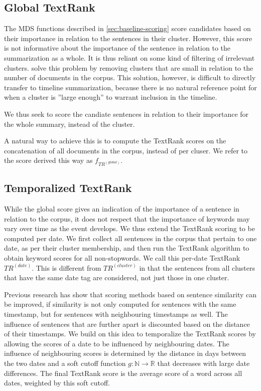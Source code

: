 \documentclass[a4paper,BCOR=10mm]{report}
\numberwithin{lemma}{chapter}
\numberwithin{definition}{chapter}
\begin{document}
\subsection{Global TextRank}

The MDS functions described in \ref{sec:baseline-scoring} score candidates based on their importance in relation to the sentences in their cluster.
However, this score is not informative about the importance of the sentence in relation to the summarization as a whole.
It is thus reliant on some kind of filtering of irrelevant clusters. \citet{banerjee} solve this problem by removing clusters that are small in relation to the number of documents in the corpus. This solution, however, is difficult to directly transfer to timeline summarization, because there is no natural reference point for when a cluster is ''large enough'' to warrant inclusion in the timeline.

We thus seek to score the candiate sentences in relation to their importance for the whole summary, instead of the cluster.

A natural way to achieve this is to compute the TextRank \citep{textrank} scores on the concatenation of all documents in the corpus, instead of per cluser.
We refer to the score derived this way as $f_{TR^{(global)}}$.

\subsection{Temporalized TextRank}

While the global score gives an indication of the importance of a sentence in relation to the corpus, it does not respect that the importance of keywords may vary over time as the event develops.
We thus extend the TextRank scoring to be computed per date. We first collect all sentences in the corpus that pertain to one date, as per their cluster membership, and then run the TextRank algorithm to obtain keyword scores for all non-stopwords. We call this per-date TextRank $TR^{(date)}$.
This is different from $TR^{(cluster)}$ in that the sentences from all clusters that have the same date tag are considered, not just those in one cluster.

Previous research \citep{yan-trans, markert} has show that scoring methods based on sentence similarity can be improved, if similarity is not only computed for sentences with the same timestamp, but for sentences with neighbouring timestamps as well. The influence of sentences that are further apart is discounted based on the distance of their timestamps.
We build on this idea to temporalize the TextRank scores by allowing the scores of a date to be influenced by neighbouring dates. The influence of neighbouring scores is determined by the distance in days between the two dates and a soft cutoff function $g: \mathbb{N} \rightarrow \mathbb{R}$ that decreases with large date differences.
The final TextRank score is the average score of a word across all dates, weighted by this soft cutoff.
\end{document}
